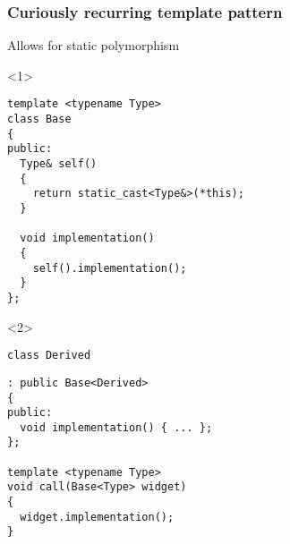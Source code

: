 \documentclass[14pt,a4paper,dvipsnames,usenames]{beamer}
\begin{document}
\begin{frame}[fragile]
  \frametitle{Curiously recurring template pattern}

  Allows for static polymorphism

  \begin{overlayarea}{\textwidth}{6.5cm}
  \begin{onlyenv}<1>
  \begin{lstlisting}
template <typename Type>
class Base
{
public:
  Type& self()
  {
    return static_cast<Type&>(*this);
  }

  void implementation()
  {
    self().implementation();
  }
};

  \end{lstlisting}
  \end{onlyenv}

  \begin{onlyenv}<2>
  \begin{lstlisting}
class Derived
  \end{lstlisting}
  \vspace*{-.4cm}
  \begin{lstlisting}[morekeywords={Base}]
  : public Base<Derived>
{
public:
  void implementation() { ... };
};

template <typename Type>
void call(Base<Type> widget)
{
  widget.implementation();
}
  \end{lstlisting}
  \end{onlyenv}
  \end{overlayarea}
  
\end{frame}
\end{document}
